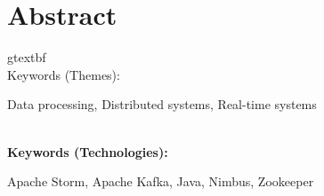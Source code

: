 \titleformat{\chapter}[display]
{\normalfont\bfseries}{}{0pt}{\Huge}

\chapter*{Abstract}


gtextbf{\\Keywords (Themes):} 

Data processing, Distributed systems, Real-time systems

\textbf{\\Keywords (Technologies):} 

Apache Storm, Apache Kafka, Java, Nimbus, Zookeeper
